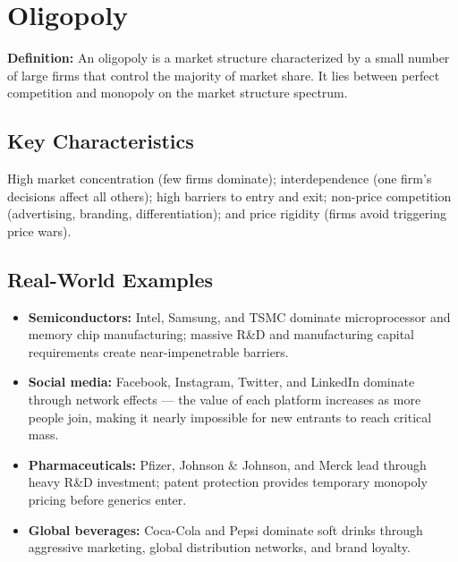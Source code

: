 \documentclass[11pt, letterpaper]{article}
\begin{document}
\newpage

\section{Oligopoly}

\begin{defbox}
\textbf{Definition:} An oligopoly is a market structure characterized by a small number of large firms that control the majority of market share. It lies between perfect competition and monopoly on the market structure spectrum.
\end{defbox}

\subsection{Key Characteristics}

High market concentration (few firms dominate); interdependence (one firm's decisions affect all others); high barriers to entry and exit; non-price competition (advertising, branding, differentiation); and price rigidity (firms avoid triggering price wars).

\subsection{Real-World Examples}

\begin{itemize}[leftmargin=*]
  \item \textbf{Semiconductors:} Intel, Samsung, and TSMC dominate microprocessor and memory chip manufacturing; massive R\&D and manufacturing capital requirements create near-impenetrable barriers.
  \item \textbf{Social media:} Facebook, Instagram, Twitter, and LinkedIn dominate through network effects --- the value of each platform increases as more people join, making it nearly impossible for new entrants to reach critical mass.
  \item \textbf{Pharmaceuticals:} Pfizer, Johnson \& Johnson, and Merck lead through heavy R\&D investment; patent protection provides temporary monopoly pricing before generics enter.
  \item \textbf{Global beverages:} Coca-Cola and Pepsi dominate soft drinks through aggressive marketing, global distribution networks, and brand loyalty.
\end{itemize}
\end{document}
